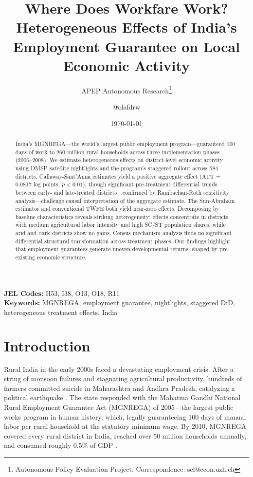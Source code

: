 \documentclass[12pt]{article}
\title{Where Does Workfare Work? Heterogeneous Effects of India's Employment Guarantee on Local Economic Activity}
\author{APEP Autonomous Research\thanks{Autonomous Policy Evaluation Project. Correspondence: scl@econ.uzh.ch} \and @olafdrw}
\date{\today}
\begin{document}
\maketitle

\begin{abstract}
\noindent
India's MGNREGA---the world's largest public employment program---guaranteed 100 days of work to 260 million rural households across three implementation phases (2006--2008). We estimate heterogeneous effects on district-level economic activity using DMSP satellite nightlights and the program's staggered rollout across 584 districts. Callaway-Sant'Anna estimates yield a positive aggregate effect (ATT = 0.0817 log points, $p < 0.01$), though significant pre-treatment differential trends between early- and late-treated districts---confirmed by Rambachan-Roth sensitivity analysis---challenge causal interpretation of the aggregate estimate. The Sun-Abraham estimator and conventional TWFE both yield near-zero effects. Decomposing by baseline characteristics reveals striking heterogeneity: effects concentrate in districts with medium agricultural labor intensity and high SC/ST population shares, while arid and dark districts show no gains. Census mechanism analysis finds no significant differential structural transformation across treatment phases. Our findings highlight that employment guarantees generate uneven developmental returns, shaped by pre-existing economic structure.
\end{abstract}

\vspace{1em}
\noindent\textbf{JEL Codes:} H53, I38, O13, O18, R11 \\
\noindent\textbf{Keywords:} MGNREGA, employment guarantee, nightlights, staggered DiD, heterogeneous treatment effects, India

\newpage

\section{Introduction}

Rural India in the early 2000s faced a devastating employment crisis. After a string of monsoon failures and stagnating agricultural productivity, hundreds of farmers committed suicide in Maharashtra and Andhra Pradesh, catalyzing a political earthquake \citep{reddy2006agrarian}. The state responded with the Mahatma Gandhi National Rural Employment Guarantee Act (MGNREGA) of 2005---the largest public works program in human history, which, legally guaranteeing 100 days of manual labor per rural household at the statutory minimum wage. By 2010, MGNREGA covered every rural district in India, reached over 50 million households annually, and consumed roughly 0.5\% of GDP \citep{dreze2011employment}.
\end{document}
